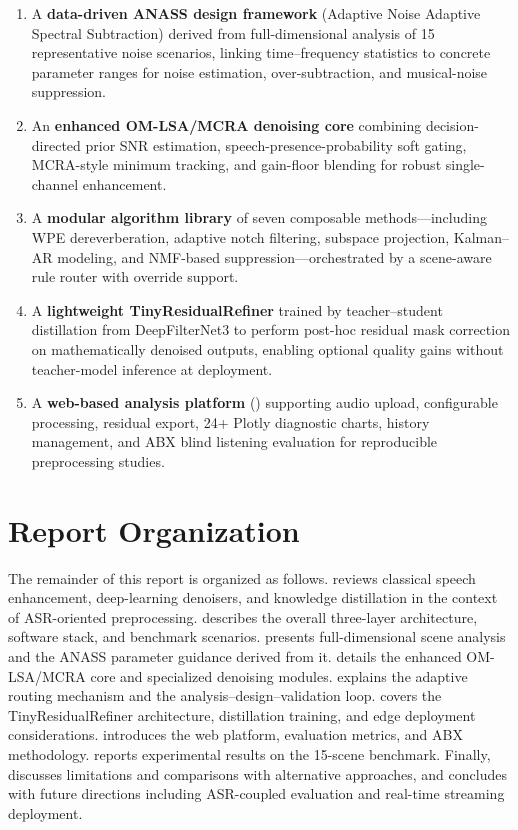 \begin{enumerate}
  \item A \textbf{data-driven ANASS design framework} (Adaptive Noise Adaptive Spectral Subtraction) derived from full-dimensional analysis of 15 representative noise scenarios, linking time--frequency statistics to concrete parameter ranges for noise estimation, over-subtraction, and musical-noise suppression.
  \item An \textbf{enhanced OM-LSA/MCRA denoising core} combining decision-directed prior SNR estimation, speech-presence-probability soft gating, MCRA-style minimum tracking, and gain-floor blending for robust single-channel enhancement.
  \item A \textbf{modular algorithm library} of seven composable methods---including WPE dereverberation, adaptive notch filtering, subspace projection, Kalman--AR modeling, and NMF-based suppression---orchestrated by a scene-aware rule router with override support.
  \item A \textbf{lightweight TinyResidualRefiner} trained by teacher--student distillation from DeepFilterNet3 to perform post-hoc residual mask correction on mathematically denoised outputs, enabling optional quality gains without teacher-model inference at deployment.
  \item A \textbf{web-based analysis platform} (\projectshort{}) supporting audio upload, configurable processing, residual export, 24+ Plotly diagnostic charts, history management, and ABX blind listening evaluation for reproducible preprocessing studies.
\end{enumerate}

\section{Report Organization}
\label{sec:organization}

The remainder of this report is organized as follows.
 reviews classical speech enhancement, deep-learning denoisers, and knowledge distillation in the context of ASR-oriented preprocessing.
 describes the overall three-layer architecture, software stack, and benchmark scenarios.
 presents full-dimensional scene analysis and the ANASS parameter guidance derived from it.
 details the enhanced OM-LSA/MCRA core and specialized denoising modules.
 explains the adaptive routing mechanism and the analysis--design--validation loop.
 covers the TinyResidualRefiner architecture, distillation training, and edge deployment considerations.
 introduces the web platform, evaluation metrics, and ABX methodology.
 reports experimental results on the 15-scene benchmark.
Finally,  discusses limitations and comparisons with alternative approaches, and  concludes with future directions including ASR-coupled evaluation and real-time streaming deployment.
